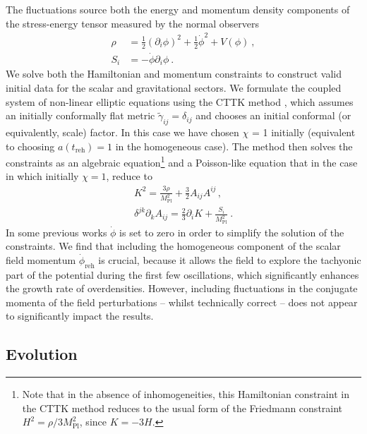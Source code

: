 \documentclass[
    reprint,
    preprintnumbers,
    superscriptaddress,
    nofootinbib,
     amsmath,amssymb,
     aps,
     prd,
    floatfix,
    ]{revtex4-2}
\newcommand{\mpl}{M_\mathrm{Pl}}
\newcommand{\reh}{_\mathrm{reh}}
\begin{document}
The fluctuations source both the energy and momentum density components of the stress-energy tensor measured by the normal observers
\begin{align}
    \rho &= \frac{1}{2}(\partial_i \phi)^2 + \frac{1}{2}\dot{\phi}^2 + V(\phi)~, \\
    S_i &= -\dot{\phi} \partial_i \phi~.
\end{align}
We solve both the Hamiltonian and momentum constraints to construct valid initial data for the scalar and gravitational sectors. We formulate the coupled system of non-linear elliptic equations using the CTTK method \cite{Aurrekoetxea:2022mpw}, which assumes an initially conformally flat metric $\tilde{\gamma}_{ij} = \delta_{ij}$ and chooses an initial conformal (or equivalently, scale) factor. In this case we have chosen $\chi$ = 1 initially (equivalent to choosing $a(t\reh)=1$ in the homogeneous case). The method then solves the constraints as an algebraic equation\footnote{Note that in the absence of inhomogeneities, this Hamiltonian constraint in the CTTK method reduces to the usual form of the Friedmann constraint $H^2 = \rho/3\mpl^2$, since $K=-3H$.} and a Poisson-like equation that in the case in which initially $\chi=1$, reduce to
\begin{align}
    K^2 = \frac{3\rho}{\mpl^2} + \frac{3}{2}A_{ij}A^{ij} \,,\\
    \delta^{jk}\partial_k A_{ij} = \frac{2}{3} \partial_i K + \frac{S_i}{\mpl^2}~.
\end{align}
In some previous works $\dot{\phi}$ is set to zero in order to simplify the solution of the constraints. We find that including the homogeneous component of the scalar field momentum $\dot{\phi}\reh$ is crucial, because it allows the field to explore the tachyonic part of the potential during the first few oscillations, which significantly enhances the growth rate of overdensities. However, including fluctuations in the conjugate momenta of the field perturbations -- whilst technically correct -- does not appear to significantly impact the results.

\subsection{Evolution}
\end{document}
